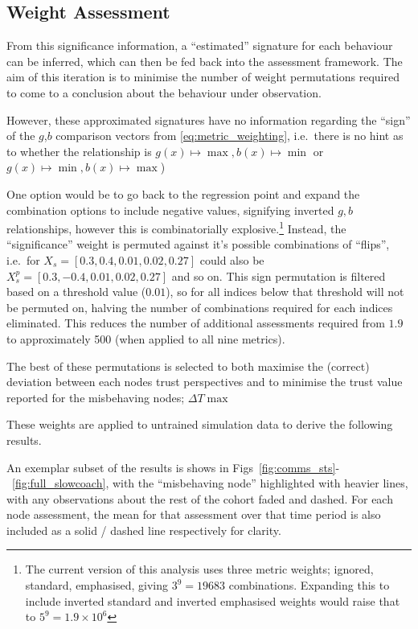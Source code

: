 %

\subsection{Weight Assessment}

From this significance information, a ``estimated'' signature for each behaviour can be inferred, which can then be fed back into the assessment framework. 
The aim of this iteration is to minimise the number of weight permutations required to come to a conclusion about the behaviour under observation. 

However, these approximated signatures have no information regarding the ``sign'' of the  $g$,$b$ comparison vectors from \eqref{eq:metric_weighting}, i.e.\ there is no hint as to whether the relationship is $g(x) \mapsto \max, b(x) \mapsto \min$ or $g(x) \mapsto \min, b(x) \mapsto \max$)  

One option would be to go back to the regression point and expand the combination options to include negative values, signifying inverted $g,b$ relationships, however this is combinatorially explosive.\footnote{The current version of this analysis uses three metric weights; ignored, standard, emphasised, giving $3^9 = 19683$ combinations. Expanding this to include inverted standard and inverted emphasised weights would raise that to $5^9 = 1.9\times 10^6$}
Instead, the ``significance'' weight is permuted against it's possible combinations of ``flips'', i.e.\ for $X_s=[0.3,0.4,0.01,0.02,0.27]$ could also be $X_s^p=[0.3,-0.4,0.01,0.02,0.27]$ and so on. 
This sign permutation is filtered based on a threshold value ($0.01$), so for all indices below that threshold will not be permuted on, halving the number of combinations required for each indices eliminated.
This reduces the number of additional assessments required from $1.9$ to approximately 500 (when applied to all nine metrics).

The best of these permutations is selected to both maximise the (correct) deviation between each nodes trust perspectives and to minimise the trust value reported for the misbehaving nodes; $\Delta T \max$

These weights are applied to untrained simulation data to derive the following results.

An exemplar subset of the results is shows in Figs~\ref{fig:comms_sts}-~\ref{fig:full_slowcoach}, with the ``misbehaving node'' highlighted with heavier lines, with any observations about the rest of the cohort faded and dashed. For each node assessment, the mean for that assessment over that time period is also included as a solid / dashed line respectively for clarity.

